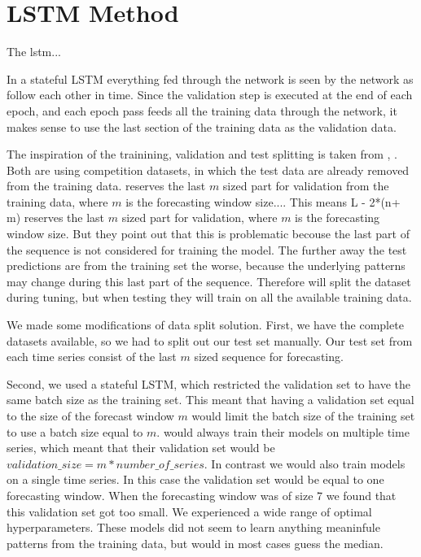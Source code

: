 \section{LSTM Method}
The lstm...


In a stateful LSTM everything fed through the network is seen by the network
as follow each other in time. Since the validation step is executed at the end of
each epoch, and each epoch pass feeds all the training data through the network,
it makes sense to use the last section of the training data as the validation data.

The inspiration of the trainining, validation and test splitting is taken from
\cite{Bandara2019}, \cite{Hewamalage2021}.
Both are using competition datasets, in which the test data are already
removed from the training data.
\cite{Bandara2019} reserves the last $m$ sized part for validation from the training data,
where $m$ is the forecasting window size.... This means L - 2*(n+ m)
\cite{Hewamalage2021} reserves the last $m$ sized part for validation,
where $m$ is the forecasting window size.
But they point out that this is problematic becouse the last part of the sequence is
not considered for training the model.
The further away the test predictions are from the training set the worse,
because the underlying patterns may change during this last part of the sequence.
Therefore \cite{Hewamalage2021} will split the dataset during tuning, but when testing
they will train on all the available training data.

We made some modifications of \cite{Hewamalage2021} data split solution.
First, we have the complete datasets available, so we had to split out our
test set manually. Our test set from each time series consist of the last $m$ sized
sequence for forecasting.

Second, we used a stateful LSTM, which restricted the validation set to have the
same batch size as the training set. This meant that having a validation set equal
to the size of the forecast window $m$ would limit the batch size of the training set
to use a batch size equal to $m$. \cite{Bandara2019} would always
train their models on multiple time series, which meant that their validation set would
be $validation\_size = m * number\_of\_series$. In contrast we would also train models on
a single time series. In this case the validation set would be equal to one forecasting window.
When the forecasting window was of size 7 we found that this validation set got too small.
We experienced a wide range of optimal hyperparameters. These models did not seem to
learn anything meaninfule patterns from the training data, but would in most cases guess
the median.

